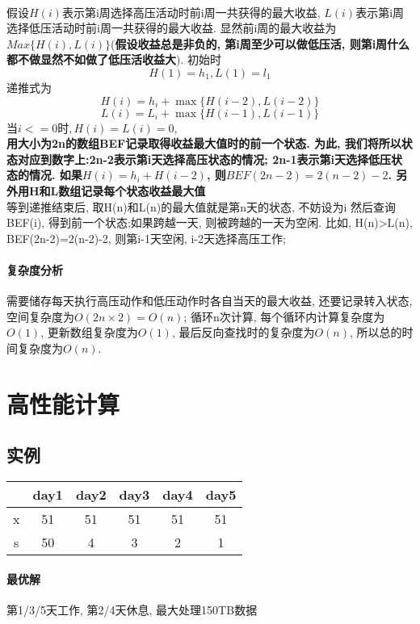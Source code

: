 \documentclass[a4paper,10pt]{article}
\begin{document}
  \paragraph{} 假设$H(i)$表示第i周选择高压活动时前i周一共获得的最大收益, $L(i)$表示第i周选择低压活动时前i周一共获得的最大收益. 显然前i周的最大收益为$Max\{H(i), L(i)\}$(\textbf{假设收益总是非负的, 第i周至少可以做低压活, 则第i周什么都不做显然不如做了低压活收益大}). 初始时
  $$H(1) = h_1, L(1)=l_1$$
  递推式为
  $$H(i)=h_i+\max\{H(i-2), L(i-2)\}$$
  $$L(i)=L_i+\max\{H(i-1), L(i-1)\}$$
  当$i<=0时, H(i)=L(i)=0$,\\
   \textbf{用大小为2n的数组BEF记录取得收益最大值时的前一个状态. 为此, 我们将所以状态对应到数字上:2n-2表示第i天选择高压状态的情况; 2n-1表示第i天选择低压状态的情况. 如果$H(i)=h_i+H(i-2)$, 则$BEF(2n-2)=2(n-2)-2$. 另外用H和L数组记录每个状态收益最大值}\\
   等到递推结束后, 取H(n)和L(n)的最大值就是第n天的状态, 不妨设为i 然后查询BEF(i), 得到前一个状态;如果跨越一天, 则被跨越的一天为空闲. 比如, H(n)>L(n), BEF(2n-2)=2(n-2)-2, 则第i-1天空闲, i-2天选择高压工作;
  \paragraph{复杂度分析} 需要储存每天执行高压动作和低压动作时各自当天的最大收益, 还要记录转入状态, 空间复杂度为$O(2n\times 2)=O(n)$; 循环n次计算, 每个循环内计算复杂度为$O(1)$, 更新数组复杂度为$O(1)$, 最后反向查找时的复杂度为$O(n)$, 所以总的时间复杂度为$O(n)$.\\
  
  
  \section{高性能计算}
  \subsection{实例}
  
  \begin{tabular}{|c|c|c|c|c|c|}
  \hline & day1 & day2 & day3 & day4 & day5 \\
  \hline x & 51 & 51 & 51 & 51 & 51 \\
  \hline s & 50 & 4 & 3 & 2 & 1 \\
  \hline
  \end{tabular} 
  \paragraph{最优解} 第1/3/5天工作, 第2/4天休息, 最大处理150TB数据
  
\end{document}
